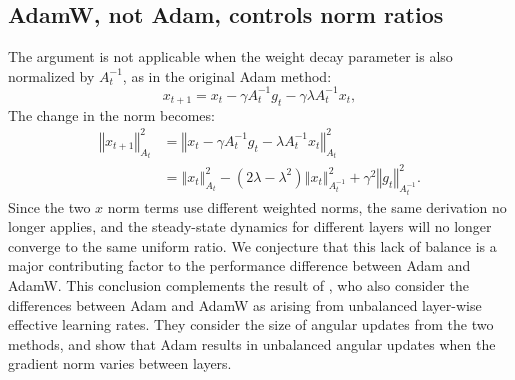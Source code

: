 \documentclass[]{fairmeta}
\begin{document}
\subsection{AdamW, not Adam, controls norm ratios}
\label{sec:why-adamw}
The argument is not applicable when the weight decay parameter is also normalized by $A^{-1}_t$, as in the original Adam method:
\[
x_{t+1}=x_{t}-\gamma A_{t}^{-1}g_{t}-\gamma\lambda A_{t}^{-1}x_{t},
\]
The change in the norm becomes:
\begin{align*}
\left\Vert x_{t+1}\right\Vert _{A_{t}}^{2} & =\left\Vert x_{t}-\gamma A_{t}^{-1}g_{t}-\lambda A_{t}^{-1}x_{t}\right\Vert _{A_{t}}^{2}\\
 & =\left\Vert x_{t}\right\Vert _{A_{t}}^{2}-\left(2\lambda-\lambda^{2}\right)\left\Vert x_{t}\right\Vert _{A^{-1}_{t}}^{2}+\gamma^{2}\left\Vert g_{t}\right\Vert _{A_{t}^{-1}}^{2}.
\end{align*}
Since the two $x$ norm terms use different weighted norms, the same derivation no longer applies, and the steady-state dynamics for different layers will no longer converge to the same uniform ratio. We conjecture that this lack of balance is a major contributing factor to the performance difference between Adam and AdamW. This conclusion complements the result of \citet{kosson2024rotationalequilibriumweightdecay}, who also consider the differences between Adam and AdamW as arising from unbalanced layer-wise effective learning rates. They consider the size of  angular updates from the two methods, and show that Adam results in unbalanced angular updates when the gradient norm varies between layers.
\end{document}
